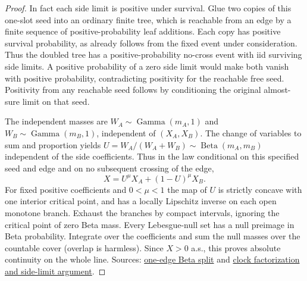\documentclass[11pt]{article}
\newcommand{\proofsrc}[2]{\href{https://github.com/uzay-eth/friend-tree-exponent/blob/a0972085ad72ad5685ae7b424988648d1965e73c/#1}{#2}}
\newcommand{\sectag}[1]{\renewcommand{\thesection}{#1}\renewcommand{\theHsection}{#1}}
\theoremstyle{remark}
\numberwithin{equation}{section}
\begin{document}
\begin{proof}
In fact each side limit is positive under survival. Glue two copies of this one-slot seed into an ordinary finite tree, which is reachable from an edge by a finite sequence of positive-probability leaf additions. Each copy has positive survival probability, as already follows from the fixed event under consideration. Thus the doubled tree has a positive-probability no-cross event with iid surviving side limits. A positive probability of a zero side limit would make both vanish with positive probability, contradicting positivity for the reachable free seed. Positivity from any reachable seed follows by conditioning the original almost-sure limit on that seed.

The independent masses are $W_A\sim\operatorname{Gamma}(m_A,1)$ and $W_B\sim\operatorname{Gamma}(m_B,1)$, independent of $(X_A,X_B)$. The change of variables to sum and proportion yields $U=W_A/(W_A+W_B)\sim\operatorname{Beta}(m_A,m_B)$ independent of the side coefficients. Thus in the law conditional on this specified seed and edge and on no subsequent crossing of the edge,
\[
 X=U^\mu X_A+(1-U)^\mu X_B.
\]
For fixed positive coefficients and $0<\mu<1$ the map of $U$ is strictly concave with one interior critical point, and has a locally Lipschitz inverse on each open monotone branch. Exhaust the branches by compact intervals, ignoring the critical point of zero Beta mass. Every Lebesgue-null set has a null preimage in Beta probability. Integrate over the coefficients and sum the null masses over the countable cover (overlap is harmless). Since $X>0$ a.s., this proves absolute continuity on the whole line. Sources: \proofsrc{round2/proofs/neon2/limit-density/README.md}{one-edge Beta split} and \proofsrc{round2/proofs/neon2/limit-density/REPORT.md}{clock factorization and side-limit argument}.
\end{proof}

\sectag{MASS}
\end{document}
